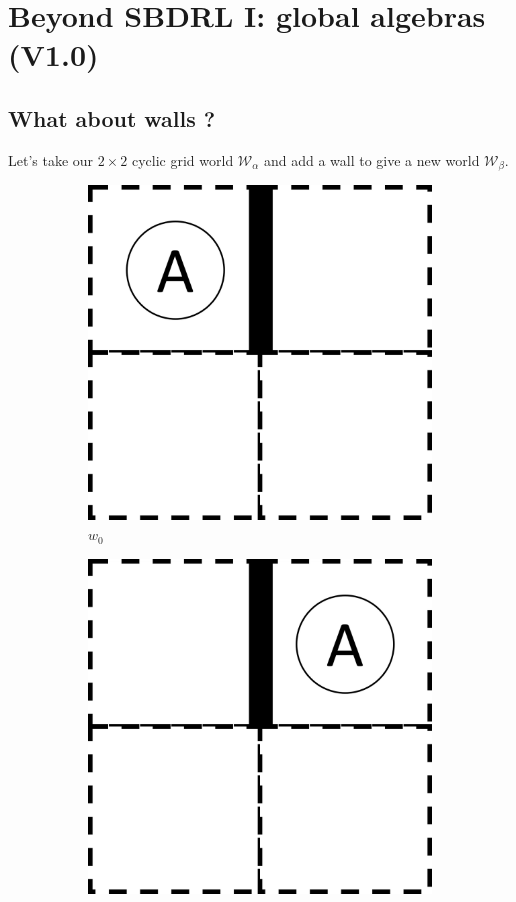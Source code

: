 \chapter{
Beyond SBDRL I: global algebras
(V1.0)
}

\section{What about walls ?}

Let's take our $2 \times 2$ cyclic grid world $\mathscr{W}_{\alpha}$ and add a wall to give a new world $\mathscr{W}_{\beta}$.

\begin{figure}[H]
  \centering
    \begin{subfigure}[b]{0.45\linewidth}
        \centering
        \includegraphics[width=0.5\linewidth]{5BeyondSBDRLGlobalAlgebras/Images/2x2_with_wall_world_states/w0.png}
        \caption{$w_{0}$}
        \vspace{0.25cm}
    \end{subfigure}
    \begin{subfigure}[b]{0.45\linewidth}
        \centering
        \includegraphics[width=0.5\linewidth]{5BeyondSBDRLGlobalAlgebras/Images/2x2_with_wall_world_states/w1.png}

\end{subfigure}
\end{figure}
